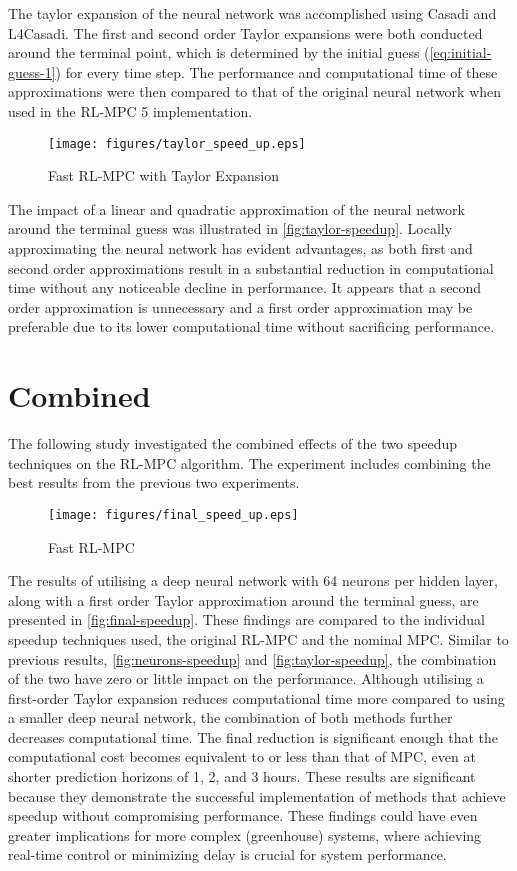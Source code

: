 The taylor expansion of the neural network was accomplished using Casadi and L4Casadi. The first and second order Taylor expansions were both conducted around the terminal point, which is determined by the initial guess (\autoref{eq:initial-guess-1}) for every time step. The performance and computational time of these approximations were then compared to that of the original neural network when used in the RL-MPC 5 implementation.


\begin{figure}[H]
	\centering
	\texttt{[image: figures/taylor\_speed\_up.eps]}
	\caption{Fast RL-MPC with Taylor Expansion}
	\label{fig:taylor-speedup}
\end{figure}

The impact of a linear and quadratic approximation of the neural network around the terminal guess was illustrated in \autoref{fig:taylor-speedup}. Locally approximating the neural network has evident advantages, as both first and second order approximations result in a substantial reduction in computational time without any noticeable decline in performance. It appears that a second order approximation is unnecessary and a first order approximation may be preferable due to its lower computational time without sacrificing performance.


\section{Combined}
The following study investigated the combined effects of the two speedup techniques on the RL-MPC algorithm. The experiment includes combining the best results from the previous two experiments.


\begin{figure}[H]
	\centering
	\texttt{[image: figures/final\_speed\_up.eps]}
	\caption{Fast RL-MPC}
	\label{fig:final-speedup}
\end{figure}


The results of utilising a deep neural network with 64 neurons per hidden layer, along with a first order Taylor approximation around the terminal guess, are presented in \autoref{fig:final-speedup}. These findings are compared to the individual speedup techniques used, the original RL-MPC and the nominal MPC. Similar to previous results, \autoref{fig:neurons-speedup} and \autoref{fig:taylor-speedup}, the combination of the two have zero or little impact on the performance. Although utilising a first-order Taylor expansion reduces computational time more compared to using a smaller deep neural network, the combination of both methods further decreases computational time. The final  reduction is significant enough that the computational cost becomes equivalent to or less than that of MPC, even at shorter prediction horizons of 1, 2, and 3 hours. These results are significant because they demonstrate the successful implementation of methods that achieve speedup without compromising performance. These findings could have even greater implications for more complex (greenhouse) systems, where achieving real-time control or minimizing delay is crucial for system performance.



